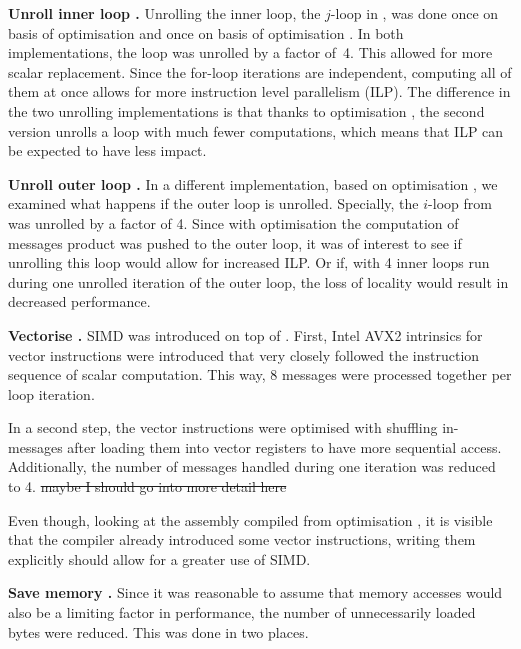 \documentclass[final,letterpaper]{article}
\let\cref=\Cref %
\newcommand{\mypar}[1]{{\bf #1.}}
\begin{document}
\mypar{Unroll inner loop }
Unrolling the inner loop, the $j$-loop in \cref{algo:propagate}, was done once on basis of optimisation  and once on basis of optimisation . In both implementations, the loop was unrolled by a factor of~4. This allowed for more scalar replacement. Since the for-loop iterations are independent, computing all of them at once allows for more instruction level parallelism (ILP).
The difference in the two unrolling implementations is that thanks to optimisation , the second version unrolls a loop with much fewer computations, which means that ILP can be expected to have less impact.

\mypar{Unroll outer loop }
In a different implementation, based on optimisation , we examined what happens if the outer loop is unrolled. Specially, the $i$-loop from \cref{algo:propagate} was unrolled by a factor of 4. Since with optimisation  the computation of messages product was pushed to the outer loop, it was of interest to see if unrolling this loop would allow for increased ILP. Or if, with 4 inner loops run during one unrolled iteration of the outer loop, the loss of locality would result in decreased performance.

\mypar{Vectorise }
SIMD was introduced on top of . First, Intel AVX2 intrinsics for vector instructions were introduced that very closely followed the instruction sequence of scalar computation. This way, 8 messages were processed together per loop iteration.

In a second step, the vector instructions were optimised with shuffling in-messages after loading them into vector registers to have more sequential access. Additionally, the number of messages handled during one iteration was reduced to 4. \st{maybe I should go into more detail here}
 
Even though, looking at the assembly compiled from optimisation , it is visible that the compiler already introduced some vector instructions, writing them explicitly should allow for a greater use of SIMD. 



\mypar{Save memory }
Since it was reasonable to assume that memory accesses would also be a limiting factor in performance, the number of unnecessarily loaded bytes were reduced. This was done in two places.
\end{document}
